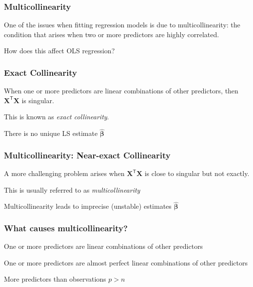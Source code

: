 \documentclass[12pt]{beamer}\usepackage[]{graphicx}\usepackage[]{color}
\begin{document}
\begin{frame}
\begin{center}
\Huge{}
\end{center}
\end{frame}


\begin{frame}
\frametitle{Multicollinearity}

One of the issues when fitting regression models is due to multicollinearity:
the condition that arises when two or more predictors are highly correlated.

\bigskip
{\lit How does this affect OLS regression?}

\end{frame}


\begin{frame}
\frametitle{Exact Collinearity}

When one or more predictors are linear combinations of other predictors, then 
$\mathbf{X^\mathsf{T} X}$ is singular.

\bigskip
This is known as \textit{exact collinearity}.

\bigskip
There is no unique LS estimate $\hat{\boldsymbol{\beta}}$

\end{frame}


\begin{frame}
\frametitle{Multicollinearity: Near-exact Collinearity}

A more challenging problem arises when $\mathbf{X^\mathsf{T} X}$ is close to singular 
but not exactly.

\bigskip
This is usually referred to as \textit{multicollinearity}

\bigskip
Multicollinearity leads to imprecise (unstable) estimates $\boldsymbol{\hat{\beta}}$

\end{frame}


\begin{frame}
\frametitle{What causes multicollinearity?}

\bbi
  \item One or more predictors are linear combinations of other predictors
  \item One or more predictors are almost perfect linear combinations of other predictors
  \item More predictors than observations $p > n$
\ei

\end{frame}
\end{document}
